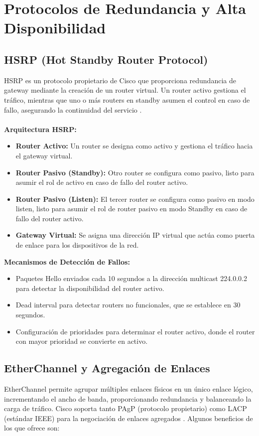 \section{Protocolos de Redundancia y Alta Disponibilidad}
\subsection{HSRP (Hot Standby Router Protocol)}
\label{subsec:hsrp}
HSRP es un protocolo propietario de Cisco que proporciona redundancia de gateway mediante la creación de un router virtual. Un router activo gestiona el tráfico, mientras que uno 
o más routers en standby asumen el control en caso de fallo, asegurando la continuidad del servicio \cite{cisco-hsrp}. \\ \\

\textbf{Arquitectura HSRP:}
\begin{itemize}
    \item \textbf{Router Activo:} Un router se designa como activo y gestiona el tráfico hacia el gateway virtual.
    \item \textbf{Router Pasivo (Standby):} Otro router se configura como pasivo, listo para asumir el rol de activo en caso de fallo del router activo.
    \item \textbf{Router Pasivo (Listen):} El tercer router se configura como pasivo en modo listen, listo para asumir el rol de router pasivo en modo Standby en caso de fallo del router activo.
    \item \textbf{Gateway Virtual:} Se asigna una dirección \acs{IP} virtual que actúa como puerta de enlace para los dispositivos de la red.
\end{itemize}
\textbf{Mecanismos de Detección de Fallos:}
\begin{itemize}
    \item Paquetes Hello enviados cada 10 segundos a la dirección multicast 224.0.0.2 para detectar la disponibilidad del router activo.
    \item Dead interval para detectar routers no funcionales, que se establece en 30 segundos.
    \item Configuración de prioridades para determinar el router activo, donde el router con mayor prioridad se convierte en activo.
\end{itemize}

\subsection{EtherChannel y Agregación de Enlaces}
\label{subsec:etherchannel}
EtherChannel permite agrupar múltiples enlaces físicos en un único enlace lógico, incrementando el ancho de banda, proporcionando redundancia y balanceando la carga de tráfico. Cisco soporta tanto
 \acs{PAgP} (protocolo propietario) como \acs{LACP} (estándar IEEE) para la negociación de enlaces agregados \cite{networklessons-etherchannel}. Algunos beneficios de los que ofrece son:

